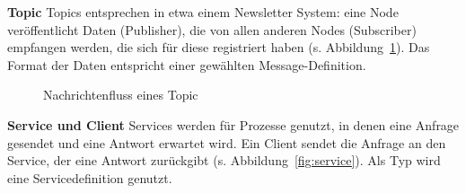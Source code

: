 \textbf{Topic} Topics entsprechen in etwa einem Newsletter System: eine Node veröffentlicht Daten (Publisher), die von allen anderen Nodes (Subscriber) empfangen werden, die sich für diese registriert haben (s. Abbildung~\ref{fig:topic}).
Das Format der Daten entspricht einer gewählten Message-Definition.\\

\begin{figure}[ht!]
    \centering
    \caption{Nachrichtenfluss eines Topic}
    \label{fig:topic}
\end{figure}
\textbf{Service und Client} Services werden für Prozesse genutzt, in denen eine Anfrage gesendet und eine Antwort erwartet wird.
Ein Client sendet die Anfrage an den Service, der eine Antwort zurückgibt (s. Abbildung~\ref{fig:service}).
Als Typ wird eine Servicedefinition genutzt.\\

